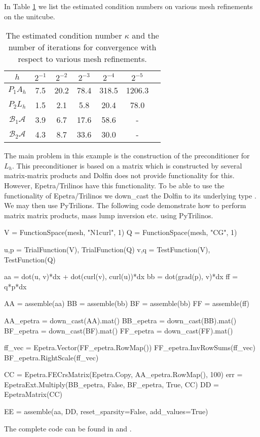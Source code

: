 In Table \ref{table:hodge} we list the estimated condition numbers on various mesh refinements
on the unitcube. 
\begin{table}
\begin{center}
\begin{tabular}{|c||c|c|c|c|c|c|}
\hline
$h$ & $2^{-1}$ & $2^{-2}$ & $2^{-3}$ & $2^{-4}$  & $2^{-5}$ \\ \hline 
$ P_1 A_h$ & 7.5 & 20.2 & 78.4 & 318.5 & 1206.3 \\ \hline
$ P_2 L_h$ & 1.5 & 2.1  & 5.8  & 20.4 & 78.0 \\ \hline
$\mathcal{B}_1 \mathcal{A}$ & 3.9 & 6.7 & 17.6 & 58.6 & - \\ \hline
$\mathcal{B}_2 \mathcal{A}$ & 4.3 & 8.7 & 33.6 & 30.0 & - \\ \hline
\end{tabular}
\caption{The estimated condition number $\kappa$ and the number of iterations for 
  convergence with respect to various mesh refinements.}  \label{table:hodge}
\end{center}
\end{table}

The main problem in this example is the construction of the preconditioner
for $L_h$. This preconditioner is based on a matrix which is constructed by 
several matrix-matrix products and Dolfin does not provide functionality for
this. However, Epetra/Trilinos have this functionality. To be able 
to use the functionality of Epetra/Trilinos we down\_cast the Dolfin 
to its underlying type . We may then use PyTrilions. 
The following code demonstrate how to perform matrix matrix products, mass lump inversion  etc. using 
PyTrilinos. 
\begin{python}
V = FunctionSpace(mesh, "N1curl", 1)
Q = FunctionSpace(mesh, "CG", 1)

u,p = TrialFunction(V), TrialFunction(Q)
v,q = TestFunction(V), TestFunction(Q)

aa = dot(u, v)*dx + dot(curl(v), curl(u))*dx   
bb = dot(grad(p), v)*dx  
ff = q*p*dx  

AA = assemble(aa) 
BB = assemble(bb) 
BF = assemble(bb) 
FF = assemble(ff)

AA_epetra = down_cast(AA).mat()
BB_epetra = down_cast(BB).mat()
BF_epetra = down_cast(BF).mat()
FF_epetra = down_cast(FF).mat()

ff_vec = Epetra.Vector(FF_epetra.RowMap())
FF_epetra.InvRowSums(ff_vec)
BF_epetra.RightScale(ff_vec)

CC = Epetra.FECrsMatrix(Epetra.Copy, AA_epetra.RowMap(), 100)
err = EpetraExt.Multiply(BB_epetra, False, BF_epetra, True, CC) 
DD = EpetraMatrix(CC)

EE = assemble(aa, DD, reset_sparsity=False, add_values=True)
\end{python}
The complete code can be found in  and . 


